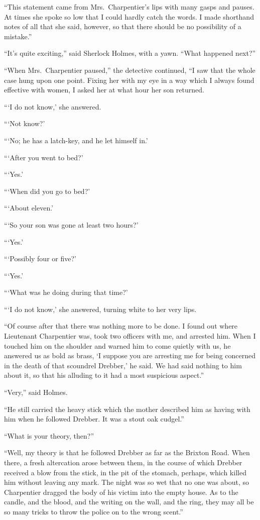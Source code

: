 \documentclass[12pt,english]{book}
\begin{document}
{}``This statement came from Mrs.\ Charpentier's lips with many
gasps and pauses. At times she spoke so low that I could hardly catch
the words. I made shorthand notes of all that she said, however, so
that there should be no possibility of a mistake.''

{}``It's quite exciting,'' said Sherlock Holmes, with a yawn. {}``What
happened next?''

{}``When Mrs.\ Charpentier paused,'' the detective continued, {}``I
saw that the whole case hung upon one point. Fixing her with my eye
in a way which I always found effective with women, I asked her at
what hour her son returned.

{}```I do not know,' she answered.

{}```Not know?'

{}```No; he has a latch-key, and he let himself in.'

{}```After you went to bed?'

{}```Yes.'

{}```When did you go to bed?'

{}```About eleven.'

{}```So your son was gone at least two hours?'

{}```Yes.'

{}```Possibly four or five?'

{}```Yes.'

{}```What was he doing during that time?'

{}```I do not know,' she answered, turning white to her very lips.

{}``Of course after that there was nothing more to be done. I found
out where Lieutenant Charpentier was, took two officers with me, and
arrested him. When I touched him on the shoulder and warned him to
come quietly with us, he answered us as bold as brass, `I suppose
you are arresting me for being concerned in the death of that scoundrel
Drebber,' he said. We had said nothing to him about it, so that his
alluding to it had a most suspicious aspect.''

{}``Very,'' said Holmes.

{}``He still carried the heavy stick which the mother described him
as having with him when he followed Drebber. It was a stout oak cudgel.''

{}``What is your theory, then?''

{}``Well, my theory is that he followed Drebber as far as the Brixton
Road. When there, a fresh altercation arose between them, in the course
of which Drebber received a blow from the stick, in the pit of the
stomach, perhaps, which killed him without leaving any mark. The night
was so wet that no one was about, so Charpentier dragged the body
of his victim into the empty house. As to the candle, and the blood,
and the writing on the wall, and the ring, they may all be so many
tricks to throw the police on to the wrong scent.''
\end{document}
